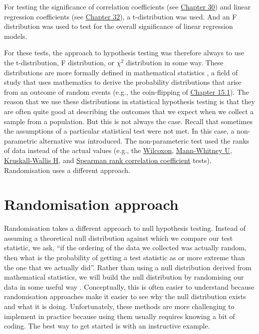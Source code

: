\documentclass[
  openany]{scrbook}
\begin{document}
For testing the significance of correlation coefficients (see \protect\hyperlink{Chapter_30}{Chapter 30}) and linear regression coefficients (see \protect\hyperlink{Chapter_32}{Chapter 32}), a t-distribution was used.
And an F distribution was used to test for the overall significance of linear regression models.

For these tests, the approach to hypothesis testing was therefore always to use the t-distribution, F distribution, or \(\chi^{2}\) distribution in some way.
These distributions are more formally defined in mathematical statistics \citep{Miller2004}, a field of study that uses mathematics to derive the probability distributions that arise from an outcome of random events (e.g., the coin-flipping of \protect\hyperlink{an-instructive-example}{Chapter 15.1}).
The reason that we use these distributions in statistical hypothesis testing is that they are often quite good at describing the outcomes that we expect when we collect a sample from a population.
But this is not always the case.
Recall that sometimes the assumptions of a particular statistical test were not met.
In this case, a non-parametric alternative was introduced.
The non-parameteric test used the ranks of data instead of the actual values (e.g., the \protect\hyperlink{wilcoxon-test}{Wilcoxon}, \protect\hyperlink{mann-whitney-u-test}{Mann-Whitney U}, \protect\hyperlink{Chapter_26}{Kruskall-Wallis H}, and \protect\hyperlink{spearman-rank-correlation-coefficient}{Spearman rank correlation coefficient} tests).
Randomisation uses a different approach.

\hypertarget{randomisation-approach}{%
\section{Randomisation approach}\label{randomisation-approach}}

Randomisation takes a different approach to null hypothesis testing.
Instead of assuming a theoretical null distribution against which we compare our test statistic, we ask, ``if the ordering of the data we collected was actually random, then what is the probability of getting a test statistic as or more extreme than the one that we actually did''.
Rather than using a null distribution derived from mathematical statistics, we will build the null distribution by randomising our data in some useful way \citep{Manly2007}.
Conceptually, this is often easier to understand because randomisation approaches make it easier to see why the null distribution exists and what it is doing.
Unfortunately, these methods are more challenging to implement in practice because using them usually requires knowing a bit of coding.
The best way to get started is with an instructive example.
\end{document}
